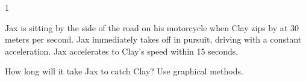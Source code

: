 
\AddToShipoutPicture*{\BackgroundPic}

\addtocounter {ProbNum} {1}

 
{\bf \Large{}} Jax is sitting by the side of the road on his motorcycle when Clay zips by at 30 meters per second.  Jax immediately takes off in pursuit, driving with a constant acceleration.  Jax accelerates to Clay's speed within 15 seconds. \bigskip

How long will it take Jax to catch Clay?  Use graphical methods. \paragraph{}
\noindent


\vfill
\newpage